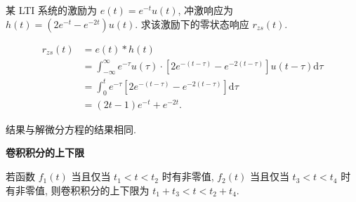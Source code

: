 \begin{exampleprob}
    某 LTI 系统的激励为 $e(t)=e^{-t}u(t)$, 冲激响应为 $h(t)=(2e^{-t}-e^{-2t})u(t)$. 求该激励下的零状态响应 $r_{zs}(t)$.

    \begin{solution}
        \rmg
        \begin{align*}
            r_{zs}(t) & =e(t)*h(t)                                                                                          \\
                      & =\int_{-\infty}^{\infty}e^{-\tau}u(\tau)\cdot[2e^{-(t-\tau)}-e^{-2(t-\tau)}]u(t-\tau)\mathrm{d}\tau \\
                      & = \int_{0}^{t}e^{-\tau}[2e^{-(t-\tau)}-e^{-2(t-\tau)}]\mathrm{d}\tau                                \\
                      & =(2t-1)e^{-t}+e^{-2t}.
        \end{align*}

        结果与解微分方程的结果相同.
    \end{solution}
\end{exampleprob}

\textbf{卷积积分的上下限}

若函数 $f_1(t)$ 当且仅当 $t_1<t<t_2$ 时有非零值, $f_2(t)$ 当且仅当 $t_3<t<t_4$ 时有非零值, 则卷积积分的上下限为 $t_1+t_3<t<t_2+t_4$.
